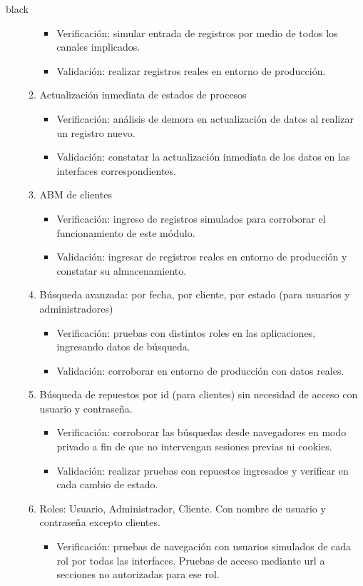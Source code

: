 \documentclass[11pt]{charter}
\begin{document}
\begin{consigna}{black}
\begin{enumerate}
\begin{enumerate}
	\begin{itemize}
	\item Verificación: simular entrada de registros por medio de todos los canales implicados. 
	\item Validación: realizar registros reales en entorno de producción.  
	\end{itemize}
	\item Actualización inmediata de estados de procesos
	\begin{itemize}
	\item Verificación: análisis de demora en actualización de datos al realizar un registro nuevo. 
	\item Validación: constatar la actualización inmediata de los datos en las interfaces correspondientes.  
	\end{itemize}
	\item ABM de clientes
	\begin{itemize}
	\item Verificación: ingreso de registros simulados para corroborar el funcionamiento de este módulo. 
	\item Validación: ingresar de registros reales en entorno de producción y constatar su almacenamiento.
	\end{itemize}
	\item Búsqueda avanzada: por fecha, por cliente, por estado (para usuarios y administradores)
	\begin{itemize}
	\item Verificación: pruebas con distintos roles en las aplicaciones, ingresando datos de búsqueda. 
	\item Validación: corroborar en entorno de producción con datos reales.  
	\end{itemize}
	\item Búsqueda de repuestos por id (para clientes) sin necesidad de acceso con usuario y contraseña.
	\begin{itemize}
	\item Verificación: corroborar las búsquedas desde navegadores en modo privado a fin de que no intervengan sesiones previas ni cookies.  
	\item Validación: realizar pruebas con repuestos ingresados y verificar en cada cambio de estado.  
	\end{itemize}
	\item Roles: Usuario, Administrador, Cliente. Con nombre de usuario y contraseña excepto clientes.
	\begin{itemize}
	\item Verificación: pruebas de navegación con usuarios simulados de cada rol por todas las interfaces. Pruebas de acceso mediante url a secciones no autorizadas para ese rol. 

\end{itemize}
\end{enumerate}
\end{enumerate}
\end{consigna}
\end{document}
